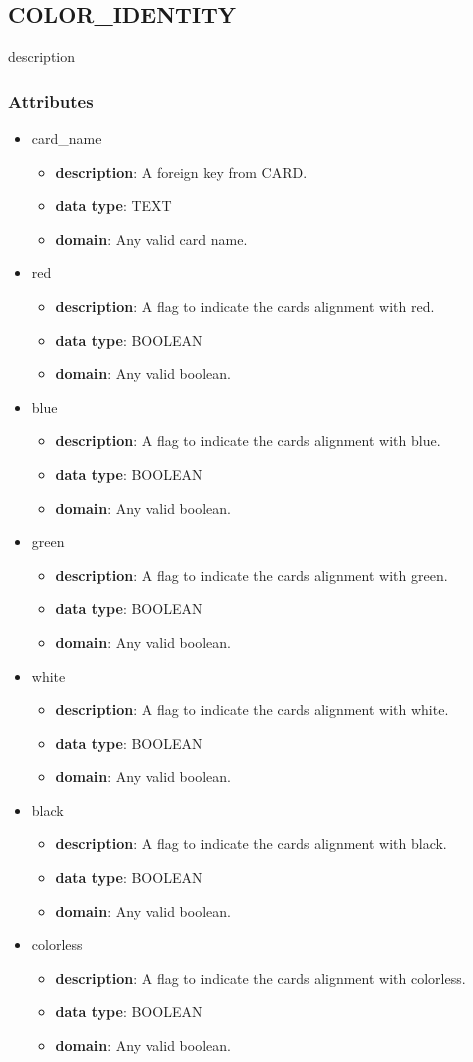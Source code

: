 \documentclass{article}
\newcommand{\tablesection}[2] {
    \subsection{#1}  %
    #2  %
    \subsubsection{Attributes}
}
\newcommand{\attribute}[4] {
    \begin{itemize}
        \item {#1}  %
            \begin{itemize}
                \item \textbf{description}: #2  %
                \item \textbf{data type}: #3  %
                \item \textbf{domain}: #4  %
            \end{itemize}
    \end{itemize}
}
\begin{document}
\tablesection{COLOR\_IDENTITY}{description}
\attribute{card\_name}{A foreign key from CARD.}{TEXT}{Any valid card name.}
\attribute{red}{A flag to indicate the cards alignment with red.}{BOOLEAN}{Any valid boolean.}
\attribute{blue}{A flag to indicate the cards alignment with blue.}{BOOLEAN}{Any valid boolean.}
\attribute{green}{A flag to indicate the cards alignment with green.}{BOOLEAN}{Any valid boolean.}
\attribute{white}{A flag to indicate the cards alignment with white.}{BOOLEAN}{Any valid boolean.}
\attribute{black}{A flag to indicate the cards alignment with black.}{BOOLEAN}{Any valid boolean.}
\attribute{colorless}{A flag to indicate the cards alignment with colorless.}{BOOLEAN}{Any valid boolean.}
\end{document}
